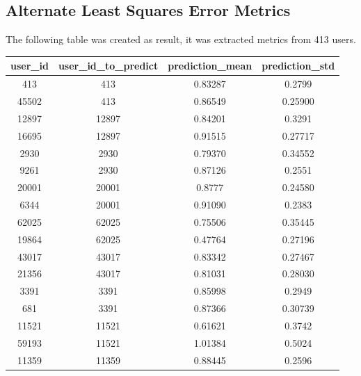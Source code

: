 \documentclass[ecp,tc,english]{iiufrgs}
\begin{document}
        \subsection{Alternate Least Squares Error Metrics}
        The following table was created as result, it was extracted metrics from 413 users.
        \begin{table}[H]
            \centering
            \begin{tabular}{ |c|c|c|c| } 
                \hline
                user\_id & user\_id\_to\_predict & prediction\_mean & prediction\_std \\
                \hline 
                413 & 413 & 0.83287 & 0.2799 \\
                45502 & 413 & 0.86549 & 0.25900 \\
                \rowcolor[RGB]{220,220,220}
                12897 & 12897 & 0.84201 & 0.3291 \\
                \rowcolor[RGB]{220,220,220}        
                16695 & 12897 & 0.91515 & 0.27717 \\
                2930 & 2930 & 0.79370 & 0.34552 \\
                9261 & 2930 & 0.87126 & 0.2551 \\
                \rowcolor[RGB]{220,220,220}        
                20001 & 20001 & 0.8777 & 0.24580 \\
                \rowcolor[RGB]{220,220,220}        
                6344 & 20001 & 0.91090 & 0.2383 \\
                62025 & 62025 & 0.75506 & 0.35445 \\
                19864 & 62025 & 0.47764 & 0.27196 \\
                \rowcolor[RGB]{220,220,220}        
                43017 & 43017 & 0.83342 & 0.27467 \\
                \rowcolor[RGB]{220,220,220}        
                21356 & 43017 & 0.81031 & 0.28030 \\
                3391 & 3391 & 0.85998 & 0.2949 \\
                681 & 3391 & 0.87366 & 0.30739 \\
                \rowcolor[RGB]{220,220,220}        
                11521 & 11521 & 0.61621 & 0.3742 \\
                \rowcolor[RGB]{220,220,220}                
                59193 & 11521 & 1.01384 & 0.5024 \\
                11359 & 11359 & 0.88445 & 0.2596 \\

\end{tabular}
\end{table}
\end{document}
